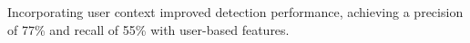 Incorporating user context improved detection performance, achieving a precision of 77\% and recall of 55\% with user-based features.
